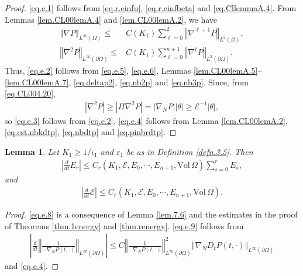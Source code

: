 \documentclass[12pt,reqno]{amsart}
\numberwithin{equation}{section}
\newtheorem{lemma}[theorem]{Lemma}
\theoremstyle{definition}
\theoremstyle{remark}
\begin{document}
\begin{proof}
  \eqref{eq.e.1} follows from \eqref{eq.r.einfu}, \eqref{eq.r.einfbeta} and \eqref{eq.CllemmaA.4}. From Lemmas \ref{lem.CL00lemA.4} and \ref{lem.CL00lemA.2},  we have
\begin{align}
  {\left\Vert{{\nabla} {P }}\right\Vert}_{L^\infty(\Omega)}{\leqslant} &C(K_1)\sum_{\ell=0}^{2} {\left\Vert{{\nabla}^{\ell+1}{P }}\right\Vert}_{L^2(\Omega)},\label{eq.e.5}\\
  {\left\Vert{{\nabla}^2{P }}\right\Vert}_{L^\infty({\partial}\Omega)}{\leqslant} &C(K_1)\sum_{\ell=0}^{n+1} {\left\Vert{{\nabla}^{\ell}{P }}\right\Vert}_{L^2({\partial}\Omega)}.\label{eq.e.6}
\end{align}
Thus, \eqref{eq.e.2} follows from \eqref{eq.e.5}, \eqref{eq.e.6}, Lemmas \ref{lem.CL00lemA.5}--\ref{lem.CL00lemA.7}, \eqref{eq.deltap2}, \eqref{eq.nb2p} and \eqref{eq.nb3p}. Since, from \eqref{eq.CL004.20},
\begin{align}\label{eq.e.7}
  |{\nabla}^2{P }|{\geqslant} |\Pi{\nabla}^2{P }|=|{\nabla}_N{P }||\theta|{\geqslant} {\mathcal{E}}^{-1}|\theta|,
\end{align}
so \eqref{eq.e.3} follows from \eqref{eq.e.2}. \eqref{eq.e.4} follows from Lemma \ref{lem.CL00lemA.2}, \eqref{eq.est.nbkdtp}, \eqref{eq.nbdtp} and \eqref{eq.pinbrdtp}.
\end{proof}

\begin{lemma}\label{lem.7.7}
  Let $K_1{\geqslant} 1/\iota_1$ and ${\varepsilon}_1$ be as in Definition \ref{defn.3.5}. Then
  \begin{align}\label{eq.e.8}
    {\left\vert{\frac{d}{dt}E_r}\right\vert}{\leqslant} C_r(K_1,{\mathcal{E}},E_0,\cdots, E_{n+1},{\mathrm{Vol}\,}\Omega)\sum_{s=0}^r E_s,
  \end{align}
  and
  \begin{align}\label{eq.e.9}
    {\left\vert{\frac{d}{dt}{\mathcal{E}}}\right\vert}{\leqslant} C_r(K_1,{\mathcal{E}},E_0,\cdots, E_{n+1},{\mathrm{Vol}\,}\Omega).
  \end{align}
\end{lemma}

\begin{proof}
  \eqref{eq.e.8} is a consequence of Lemma \ref{lem.7.6} and the estimates in the proof of Theorems \ref{thm.1energy} and \ref{thm.renergy}. \eqref{eq.e.9} follows from
  \begin{align*}
    {\left\vert{\frac{d}{dt}{\left\Vert{\frac{1}{-{\nabla}_N{P }(t,\cdot)}}\right\Vert}_{L^\infty({\partial}\Omega)}}\right\vert}{\leqslant} C{\left\Vert{\frac{1}{-{\nabla}_N{P }(t,\cdot)}}\right\Vert}_{L^\infty({\partial}\Omega)}^2 {\left\Vert{{\nabla}_ND_t{P }(t,\cdot)}\right\Vert}_{L^\infty({\partial}\Omega)}
  \end{align*}
  and \eqref{eq.e.4}.
\end{proof}
\end{document}
